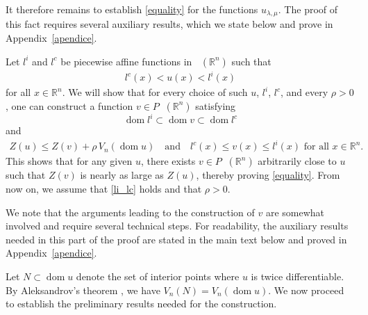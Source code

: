 \documentclass[11pt]{article}
\theoremstyle{definition} %
\newcommand{\RR}{(\mathbb{R}^n)}
\DeclareMathOperator{\LQ}{_{l.q}}
\DeclareMathOperator{\dom}{dom}
\DeclareMathOperator{\LP}{Conv_{lp}}
\begin{document}
It therefore remains to establish \eqref{equality} for the functions $u_{\lambda,\mu}$. The proof of this fact requires several auxiliary results, which we state below and prove in Appendix~\ref{apendice}.

 


 
Let $l^i$ and $l^c$ be piecewise affine functions in $\LP\RR$ such that 
\begin{align}\label{li_lc}
l^c(x)< u(x)< l^i(x)
\end{align}
for all $x\in\mathbb{R}^n$. We will show that for every choice of such $u$, $l^i$, $l^c$, and every $\rho>0$, one can construct a function $v\in P\LQ(\mathbb{R}^n)$ satisfying
$$
\dom l^i \subset \dom v \subset \dom l^c
$$
and
\begin{align}\label{eq10.22}
    Z(u)\leq Z(v)+\rho \, V_n(\dom u) \quad \mbox{and} \quad  l^c(x)\leq v(x)\leq l^i(x) \text{ for all } x\in\mathbb{R}^n.
\end{align}
This shows  that for any given $u$, there exists 
$v\in P\LQ\RR$ arbitrarily close to  $u$ such that $Z(v)$ is nearly as large as $Z(u)$, thereby proving \eqref{equality}. From now on, we assume that \eqref{li_lc} holds and that $\rho>0$.




We note that the arguments leading to the construction of $v$ are somewhat involved and require several technical steps. For readability, the auxiliary results needed in this part of the proof are stated in the main text below and proved in Appendix~\ref{apendice}.

Let $N \subset \dom u$ denote the set of interior points where $u$ is twice differentiable. 
By Aleksandrov's theorem \cite{aleksandrov1939second}, we have $V_n(N) = V_n(\dom u)$.  We now proceed to establish the preliminary results needed for the construction.
\end{document}
